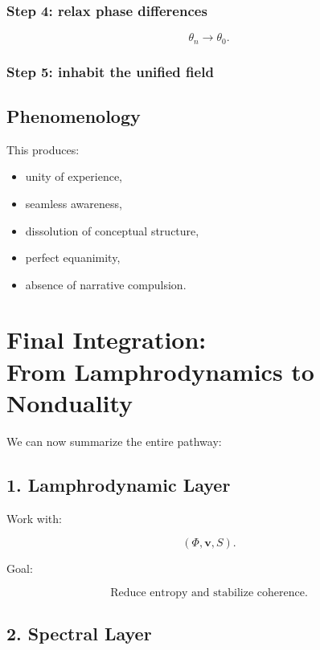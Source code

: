 \documentclass[12pt]{article}
\begin{document}
\subsection*{Step 4: relax phase differences}
\[
\theta_n \to \theta_0.
\]

\subsection*{Step 5: inhabit the unified field}

\section{Phenomenology}

This produces:

\begin{itemize}
    \item unity of experience,
    \item seamless awareness,
    \item dissolution of conceptual structure,
    \item perfect equanimity,
    \item absence of narrative compulsion.
\end{itemize}

\newpage


\chapter{Final Integration:\\ From Lamphrodynamics to Nonduality}

We can now summarize the entire pathway:

\section{1. Lamphrodynamic Layer}

Work with:

\[
(\Phi,\mathbf{v},S).
\]

Goal:

\[
\text{Reduce entropy and stabilize coherence.}
\]

\section{2. Spectral Layer}
\end{document}
